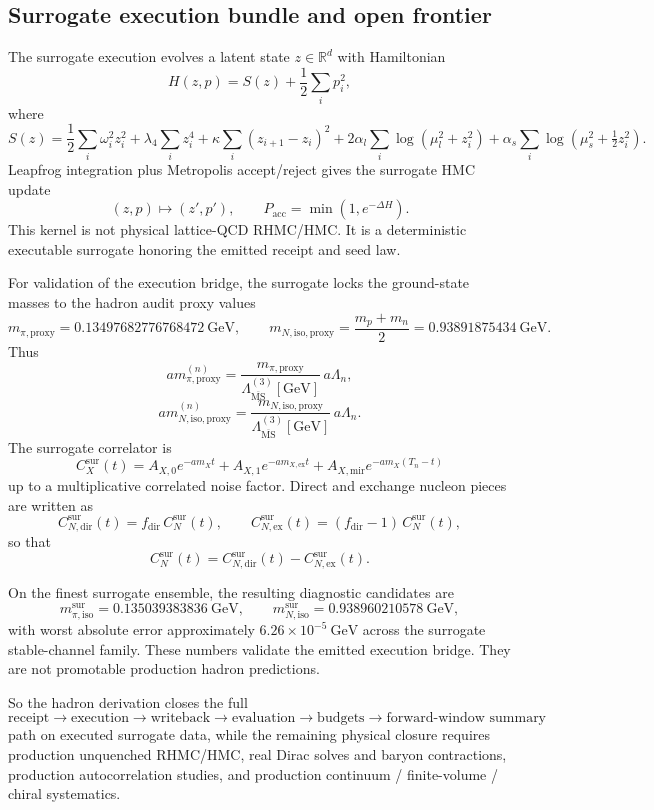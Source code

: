 \documentclass[11pt]{article}
\begin{document}
\subsection{Surrogate execution bundle and open frontier}

The surrogate execution evolves a latent state \(z\in\mathbb{R}^d\) with Hamiltonian
\[
H(z,p) = S(z) + \frac12 \sum_i p_i^2,
\]
where
\[
S(z)
=
\frac12 \sum_i \omega_i^2 z_i^2
+
\lambda_4 \sum_i z_i^4
+
\kappa \sum_i (z_{i+1}-z_i)^2
+
2\alpha_l \sum_i \log(\mu_l^2 + z_i^2)
+
\alpha_s \sum_i \log(\mu_s^2 + \tfrac12 z_i^2).
\]
Leapfrog integration plus Metropolis accept/reject gives the surrogate HMC update
\[
(z,p) \mapsto (z',p'),
\qquad
P_{\mathrm{acc}} = \min(1,e^{-\Delta H}).
\]
This kernel is not physical lattice-QCD RHMC/HMC. It is a deterministic executable surrogate
honoring the emitted receipt and seed law.

For validation of the execution bridge, the surrogate locks the ground-state masses to the hadron
audit proxy values
\[
m_{\pi,\mathrm{proxy}} = 0.13497682776768472\ \mathrm{GeV},
\qquad
m_{N,\mathrm{iso,proxy}}
=
\frac{m_p+m_n}{2}
=
0.93891875434\ \mathrm{GeV}.
\]
Thus
\[
a m_{\pi,\mathrm{proxy}}^{(n)}
=
\frac{m_{\pi,\mathrm{proxy}}}{\Lambda_{\overline{\mathrm{MS}}}^{(3)}[\mathrm{GeV}]}
\,a\Lambda_n,
\]
\[
a m_{N,\mathrm{iso,proxy}}^{(n)}
=
\frac{m_{N,\mathrm{iso,proxy}}}{\Lambda_{\overline{\mathrm{MS}}}^{(3)}[\mathrm{GeV}]}
\,a\Lambda_n.
\]
The surrogate correlator is
\[
C_X^{\mathrm{sur}}(t)
=
A_{X,0} e^{-a m_X t}
+
A_{X,1} e^{-a m_{X,\mathrm{ex}} t}
+
A_{X,\mathrm{mir}} e^{-a m_X (T_n-t)}
\]
up to a multiplicative correlated noise factor. Direct and exchange nucleon pieces are written as
\[
C_{N,\mathrm{dir}}^{\mathrm{sur}}(t)
=
f_{\mathrm{dir}}\,C_N^{\mathrm{sur}}(t),
\qquad
C_{N,\mathrm{ex}}^{\mathrm{sur}}(t)
=
(f_{\mathrm{dir}}-1)\,C_N^{\mathrm{sur}}(t),
\]
so that
\[
C_N^{\mathrm{sur}}(t)
=
C_{N,\mathrm{dir}}^{\mathrm{sur}}(t)
-
C_{N,\mathrm{ex}}^{\mathrm{sur}}(t).
\]

On the finest surrogate ensemble, the resulting diagnostic candidates are
\[
m_{\pi,\mathrm{iso}}^{\mathrm{sur}} = 0.135039383836\ \mathrm{GeV},
\qquad
m_{N,\mathrm{iso}}^{\mathrm{sur}} = 0.938960210578\ \mathrm{GeV},
\]
with worst absolute error approximately \(6.26\times10^{-5}\ \mathrm{GeV}\) across the surrogate
stable-channel family. These numbers validate the emitted execution bridge. They are not
promotable production hadron predictions.

So the hadron derivation closes the full
\[
\text{receipt} \to \text{execution} \to \text{writeback} \to \text{evaluation} \to \text{budgets} \to \text{forward-window summary}
\]
path on executed surrogate data, while the remaining physical closure requires production
unquenched RHMC/HMC, real Dirac solves and baryon contractions, production autocorrelation
studies, and production continuum / finite-volume / chiral systematics.
\end{document}
